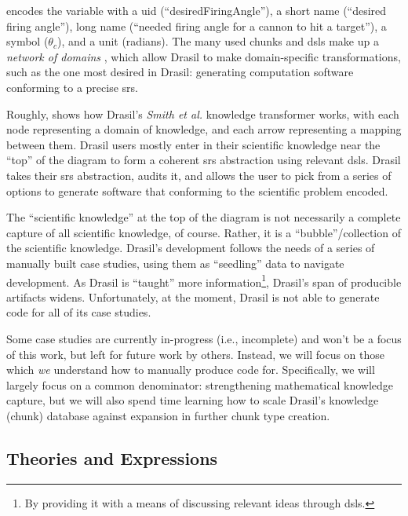 \exampleAngleVariableEncoding{}

 encodes the variable with a \acs{uid}
(``desiredFiringAngle''), a short name (``desired firing angle''), long name
(``needed firing angle for a cannon to hit a target''), a symbol
(\(\theta{}_{c}\)), and a unit (radians). The many used chunks and \acsp{dsl}
make up a \textit{network of domains} \cite{Czarnecki2005}, which allow Drasil
to make domain-specific transformations, such as the one most desired in Drasil:
generating computation software conforming to a precise \acs{srs}.

\roughNetworkOfDomainsIntro{}

Roughly,  shows how Drasil's \textit{Smith et
      al.} knowledge transformer works, with each node representing a domain of
knowledge, and each arrow representing a mapping between them. Drasil users
mostly enter in their scientific knowledge near the ``top'' of the diagram to
form a coherent \acs{srs} abstraction using relevant \acsp{dsl}. Drasil takes
their \acs{srs} abstraction, audits it, and allows the user to pick from a
series of options to generate software that conforming to the scientific problem
encoded.

The ``scientific knowledge'' at the top of the diagram is not necessarily a
complete capture of all scientific knowledge, of course. Rather, it is a
``bubble''/collection of the scientific knowledge. Drasil's development follows
the needs of a series of manually built case studies, using them as ``seedling''
data to navigate development. As Drasil is ``taught'' more
information\footnote{By providing it with a means of discussing relevant ideas
through \acsp{dsl}.}, Drasil's span of producible artifacts widens.
Unfortunately, at the moment, Drasil is not able to generate code for all of its
case studies.

Some case studies are currently in-progress (i.e., incomplete) and won't be a
focus of this work, but left for future work by others. Instead, we will focus
on those which \textit{we} understand how to manually produce code for.
Specifically, we will largely focus on a common denominator: strengthening
mathematical knowledge capture, but we will also spend time learning how to
scale Drasil's knowledge (chunk) database against expansion in further chunk
type creation.

\subsection{Theories and Expressions}
\label{chap:intro:sec:drasil:subsec:theories-and-expressions}

